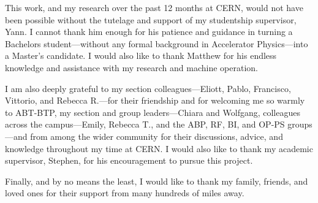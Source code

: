 This work, and my research over the past 12 months at CERN, would not have been possible without the tutelage and support of my studentship supervisor, Yann. I cannot thank him enough for his patience and guidance in turning a Bachelors student---without any formal background in Accelerator Physics---into a Master's candidate. I would also like to thank Matthew for his endless knowledge and assistance with my research and machine operation. 

I am also deeply grateful to my section colleagues---Eliott, Pablo, Francisco, Vittorio, and Rebecca R.---for their friendship and for welcoming me so warmly to ABT-BTP, my section and group leaders---Chiara and Wolfgang, colleagues across the campus---Emily, Rebecca T., and the ABP, RF, BI, and OP-PS groups---and from among the wider community for their discussions, advice, and knowledge throughout my time at CERN. I would also like to thank my academic supervisor, Stephen, for his encouragement to pursue this project.

Finally, and by no means the least, I would like to thank my family, friends, and loved ones for their support from many hundreds of miles away.